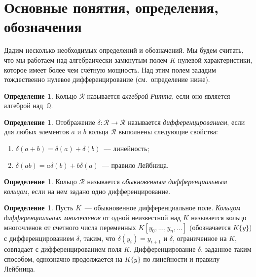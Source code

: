 \documentclass[16pt]{article}
\theoremstyle{plain}
\theoremstyle{definition}
\newtheorem{definition}[theorem]{Определение}
\theoremstyle{remark}
\begin{document}
\section{Основные понятия, определения, обозначения}
Дадим несколько необходимых определений и обозначений. Мы будем считать, что мы работаем над алгебраически замкнутым полем ${K}$ нулевой характеристики, которое имеет более чем счётную мощность. Над этим полем зададим тождественно нулевое дифференцирование (см.~определение ниже).

\begin{definition}
Кольцо $\mathcal{R}$ называется \emph{алгеброй Ритта}, если оно является алгеброй над~$\mathbb{Q}$.
\end{definition}

\begin{definition}
Отображение $\delta: \mathcal{R} \to \mathcal{R}$ называется \emph{дифференцированием}, если для любых элементов $a$ и $b$ кольца $\mathcal{R}$
выполнены следующие свойства:
\begin{enumerate}
  \item $\delta(a+b)= \delta(a)+\delta(b)$~--– линейность;
  \item $\delta(ab)=a\delta(b)+b\delta(a)$~--- правило Лейбница.
\end{enumerate}
\end{definition}

\begin{definition}
Кольцо $\mathcal{R}$ называется \emph{обыкновенным дифференциальным кольцом}, если на нем задано одно дифференцирование.
\end{definition}

\begin{definition}
Пусть $K$~--- обыкновенное дифференциальное поле.
\emph{Кольцом дифференциальных многочленов} от одной неизвестной над $K$
называется кольцо многочленов от счетного числа переменных ${K}[y_0,\ldots,y_n,\ldots]$
(обозначается ${K}\{y\}$)
с дифференцированием $\delta$, таким, что $\delta(y_i)=y_{i+1}$ и $\delta$, ограниченное на ${K}$, совпадает с дифференцированием поля $K$. Дифференцирование $\delta$, заданное таким способом, однозначно продолжается на $K\{y\}$ по линейности и правилу Лейбница.
\end{definition}
\end{document}

